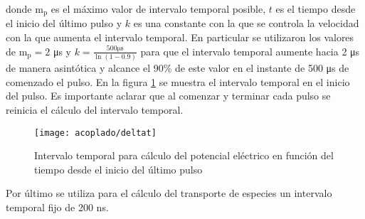 donde $\mathrm{m_p}$ es el máximo valor de intervalo temporal posible, $t$ es el tiempo desde el inicio del último pulso y $k$ es una constante con la que se controla la velocidad con la que aumenta el intervalo temporal. En particular se utilizaron los valores de $\mathrm{m_p} = 2$ \si{\micro\second} y $k = \frac{500 \si{\micro\second}}{\ln (1 - 0.9)}$ para que el intervalo temporal aumente hacia 2 \si{\micro\second} de manera asintótica y alcance el 90\% de este valor en el instante de 500 \si{\micro\second} de comenzado el pulso. En la figura \ref{fig:deltat} se muestra el intervalo temporal en el inicio del pulso. Es importante aclarar que al comenzar y terminar cada pulso se reinicia el cálculo del intervalo temporal.

\begin{figure}
	\centering
	\texttt{[image: acoplado/deltat]}
	\caption{Intervalo temporal para cálculo del potencial eléctrico en función del tiempo desde el inicio del último pulso}
	\label{fig:deltat}
\end{figure}

Por último se utiliza para el cálculo del transporte de especies un intervalo temporal fijo de 200 \si{\nano\second}.\\



